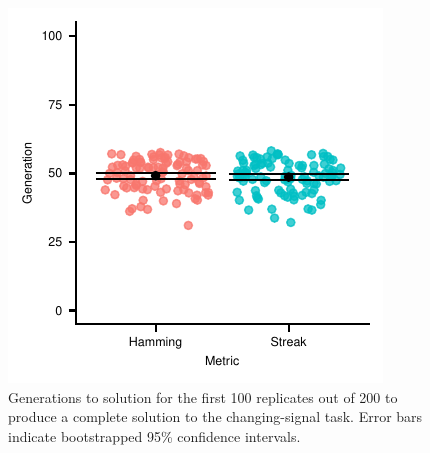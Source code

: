 \begin{figure}
\centering
\includegraphics[width=\linewidth]{img/gp_results/panel-cst-times.pdf}%
\caption{
Generations to solution for the first 100 replicates out of 200 to produce a complete solution to the changing-signal task.
Error bars indicate bootstrapped 95\% confidence intervals.
 }
\label{fig:cst-times}
\end{figure}
